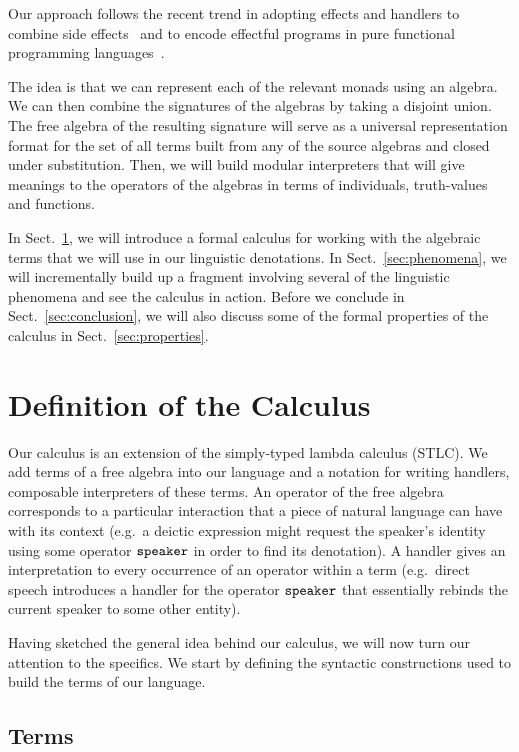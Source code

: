\documentclass{llncs}
\begin{document}
Our approach follows the recent trend in adopting effects and handlers to
combine side effects~\cite{bauer2012programming,kammar2013handlers} and to
encode effectful programs in pure functional programming
languages~\cite{kiselyov2013extensible,brady2013programming}.

The idea is that we can represent each of the relevant monads using an
algebra. We can then combine the signatures of the algebras by taking a
disjoint union. The free algebra of the resulting signature will serve as a
universal representation format for the set of all terms built from any of
the source algebras and closed under substitution. Then, we will build
modular interpreters that will give meanings to the operators of the
algebras in terms of individuals, truth-values and functions.

In Sect.~\ref{sec:definition}, we will introduce a formal calculus for
working with the algebraic terms that we will use in our linguistic
denotations. In Sect.~\ref{sec:phenomena}, we will incrementally build up a
fragment involving several of the linguistic phenomena and see the calculus
in action. Before we conclude in Sect.~\ref{sec:conclusion}, we will also
discuss some of the formal properties of the calculus in
Sect.~\ref{sec:properties}.


\section{Definition of the Calculus}
\label{sec:definition}

Our calculus is an extension of the simply-typed lambda calculus (STLC). We
add terms of a free algebra into our language and a notation for writing
handlers, composable interpreters of these terms. An operator of the free
algebra corresponds to a particular interaction that a piece of natural
language can have with its context (e.g.\ a deictic expression might
request the speaker's identity using some operator $\mathtt{speaker}$ in order
to find its denotation). A handler gives an interpretation to every
occurrence of an operator within a term (e.g.\ direct speech introduces a
handler for the operator $\mathtt{speaker}$ that essentially rebinds the
current speaker to some other entity).

Having sketched the general idea behind our calculus, we will now turn our
attention to the specifics. We start by defining the syntactic
constructions used to build the terms of our language.

\subsection{Terms}
\label{ssec:terms}
\end{document}

